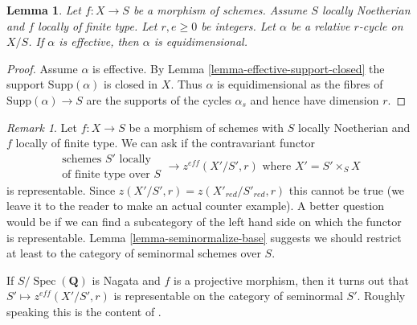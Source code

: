 \documentclass{stacks-project}
\theoremstyle{plain}
\newtheorem{lemma}[subsection]{Lemma}
\theoremstyle{definition}
\theoremstyle{remark}
\newtheorem{remark}[subsection]{Remark}
\numberwithin{equation}{subsection}
\def\Spec{\mathop{\mathrm{Spec}}}
\begin{document}
\begin{lemma}
\label{lemma-effective-equidimensional}
Let $f : X \to S$ be a morphism of schemes. Assume $S$ locally Noetherian
and $f$ locally of finite type. Let $r, e \geq 0$ be integers.
Let $\alpha$ be a relative $r$-cycle on $X/S$.
If $\alpha$ is effective, then $\alpha$ is equidimensional.
\end{lemma}

\begin{proof}
Assume $\alpha$ is effective. By Lemma \ref{lemma-effective-support-closed}
the support $\text{Supp}(\alpha)$ is closed in $X$. Thus
$\alpha$ is equidimensional as the fibres of $\text{Supp}(\alpha) \to S$
are the supports of the cycles $\alpha_s$ and hence have dimension $r$.
\end{proof}

\begin{remark}
\label{remark-representable}
Let $f : X \to S$ be a morphism of schemes with $S$ locally Noetherian
and $f$ locally of finite type. We can ask if the contravariant functor
$$
\begin{matrix}
\text{schemes }S'\text{ locally} \\
\text{of finite type over }S
\end{matrix}
\longrightarrow
z^{eff}(X'/S', r)\text{ where }X' = S' \times_S X
$$
is representable. Since $z(X'/S', r) = z(X'_{red}/S'_{red}, r)$
this cannot be true (we leave it to the reader to make an actual
counter example). A better question would be if we can find a
subcategory of the left hand side on which the functor is
representable. Lemma \ref{lemma-seminormalize-base} suggests
we should restrict at least to the category of seminormal schemes over $S$.

\medskip\noindent
If $S/\Spec(\mathbf{Q})$ is Nagata and $f$ is a projective morphism, then
it turns out that $S' \mapsto z^{eff}(X'/S', r)$ is representable on the
category of seminormal $S'$. Roughly speaking this is the content of
\cite[Theorem 3.21]{KRC}.


\end{remark}
\end{document}
